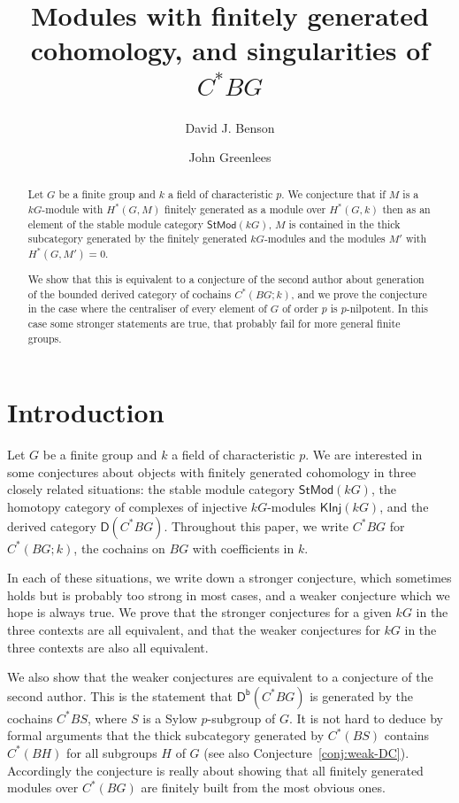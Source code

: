 \documentclass[12pt]{amsart}
\author{David J. Benson}
\author{John Greenlees}
\title{Modules with finitely generated cohomology, and singularities of $C^*BG$}
\newcommand{\DD}{\mathsf{D}}%
\newcommand{\Db}{\DD^{\mathsf{b}}}%
\newcommand{\kG}{\kk G}
\newcommand{\kk}{k}
\newcommand{\KInj}{\mathsf{KInj}}
\newcommand{\StMod}{\mathsf{StMod}}
\numberwithin{equation}{section}
\theoremstyle{plain}
\theoremstyle{definition}
\theoremstyle{remark}
\begin{document}
\begin{abstract}
Let $G$ be a finite group and $\kk$ a field of characteristic $p$. We
conjecture that if $M$ is a $\kG$-module with $H^*(G,M)$ finitely
generated as a module over $H^*(G,\kk)$ then 
as an element of the
stable module category $\StMod(\kG)$, $M$ is contained in the thick
subcategory generated by the finitely generated $\kG$-modules and the
modules $M'$ with $H^*(G,M')=0$.

We show that this is equivalent to a conjecture of the second author
about generation of the bounded
derived category of cochains $C^*(BG;\kk)$, and
we prove the conjecture in the case where the centraliser of every
element of $G$ of order $p$ is $p$-nilpotent. In this case some
stronger statements are true, that probably fail for more general
finite groups.
\end{abstract}

\maketitle

\section{Introduction}



Let $G$ be a finite group and $\kk$ a field of characteristic $p$. We
are interested in some conjectures about objects with finitely
generated cohomology in three closely related situations: the stable
module category $\StMod(\kG)$, the homotopy category of complexes of
injective $\kG$-modules $\KInj(\kG)$, and the derived category
$\DD(C^*BG)$. Throughout this paper, we write
$C^*BG$ for $C^*(BG;\kk)$, the cochains on $BG$ with coefficients in
$\kk$.

In each of these situations, we write down a stronger conjecture, which
sometimes holds but is probably too strong in most cases, and a weaker
conjecture which we hope is always true. We prove that the stronger
conjectures for a given $\kG$ in the three contexts are all equivalent, and that the
weaker conjectures for $\kG$ in the three contexts are also all
equivalent.  

We also show that the weaker conjectures are equivalent
to a conjecture of the second author. This is the
statement that $\Db(C^*BG)$ is generated by the cochains $C^*BS$,
where $S$ is a Sylow $p$-subgroup of $G$.
It is not hard to deduce by formal arguments that the thick
subcategory generated by $C^*(BS)$ contains $C^*(BH)$ for all 
subgroups $H$ of $G$ 
(see also Conjecture~\ref{conj:weak-DC}). Accordingly the conjecture
is really about showing that all finitely generated modules over
$C^*(BG)$ are finitely built from the most obvious ones.
\end{document}
